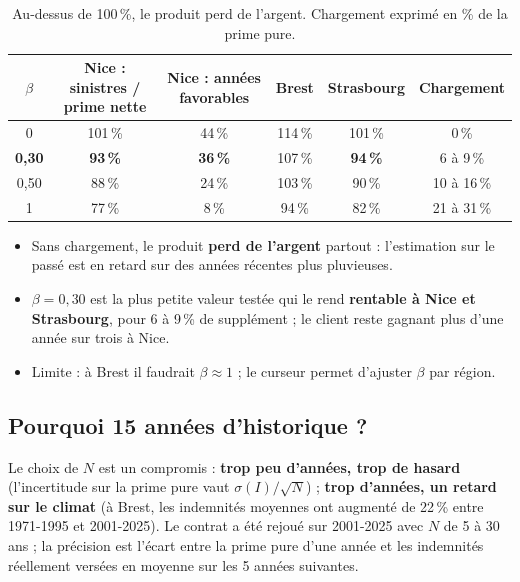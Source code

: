 \documentclass[11pt,a4paper]{article}
\begin{document}
\begin{table}[H]
\centering\small
\begin{tabular}{cccccc}
\toprule
$\beta$ & Nice : sinistres / prime nette & Nice : années favorables & Brest & Strasbourg & Chargement\\
\midrule
0 & 101\,\% & 44\,\% & 114\,\% & 101\,\% & 0\,\%\\
\textbf{0,30} & \textbf{93\,\%} & \textbf{36\,\%} & 107\,\% & \textbf{94\,\%} & 6 à 9\,\%\\
0,50 & 88\,\% & 24\,\% & 103\,\% & 90\,\% & 10 à 16\,\%\\
1 & 77\,\% & 8\,\% & 94\,\% & 82\,\% & 21 à 31\,\%\\
\bottomrule
\end{tabular}
\caption{Au-dessus de 100\,\%, le produit perd de l'argent. Chargement exprimé en \% de la prime pure.}
\end{table}

\begin{itemize}
  \item Sans chargement, le produit \textbf{perd de l'argent} partout : l'estimation sur le passé est en retard sur des
        années récentes plus pluvieuses.
  \item $\beta = 0{,}30$ est la plus petite valeur testée qui le rend \textbf{rentable à Nice et Strasbourg}, pour 6 à 9\,\%
        de supplément ; le client reste gagnant plus d'une année sur trois à Nice.
  \item Limite : à Brest il faudrait $\beta \approx 1$ ; le curseur permet d'ajuster $\beta$ par région.
\end{itemize}

\subsection{Pourquoi 15 années d'historique ?}
Le choix de $N$ est un compromis : \textbf{trop peu d'années, trop de hasard} (l'incertitude sur la prime pure vaut
$\sigma(I)/\sqrt{N}$) ; \textbf{trop d'années, un retard sur le climat} (à Brest, les indemnités moyennes ont augmenté de
22\,\% entre 1971-1995 et 2001-2025). Le contrat a été rejoué sur 2001-2025 avec $N$ de 5 à 30 ans ; la précision est
l'écart entre la prime pure d'une année et les indemnités réellement versées en moyenne sur les 5 années suivantes.
\end{document}
